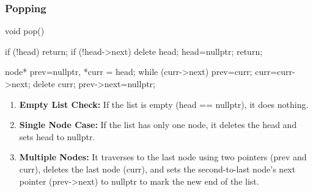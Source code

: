 \documentclass{report}
\begin{document}
    \subsubsection{Popping}
    \bigbreak \noindent 
    \begin{cppcode}
        void pop() {
            if (!head) return;
            if (!head->next) {
                delete head;
                head=nullptr;
                return;
            }

            node* prev=nullptr, *curr = head;
            while (curr->next) {
                prev=curr;
                curr=curr->next;
            }
            delete curr;
            prev->next=nullptr;
        }
    \end{cppcode}
    \bigbreak \noindent 
    \begin{enumerate}
        \item \textbf{Empty List Check:} If the list is empty (head == nullptr), it does nothing.
        \item \textbf{Single Node Case:} If the list has only one node, it deletes the head and sets head to nullptr.
        \item \textbf{Multiple Nodes:} It traverses to the last node using two pointers (prev and curr), deletes the last node (curr), and sets the second-to-last node's next pointer (prev->next) to nullptr to mark the new end of the list.
    \end{enumerate}

    \pagebreak 
\end{document}
